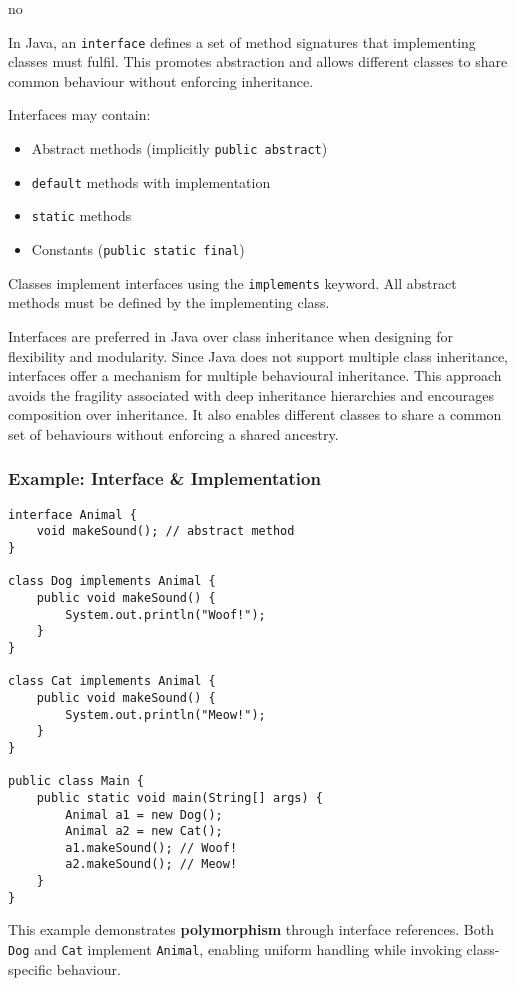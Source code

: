 no\documentclass{article}
\newcommand{\codecmd}[1]{\textcolor[rgb]{0,0.5,0}{\texttt{#1}}}
\begin{document}
In Java, an \codecmd{interface} defines a set of method signatures that implementing classes must fulfil. This promotes abstraction and allows different classes to share common behaviour without enforcing inheritance.

Interfaces may contain:
\begin{itemize}
    \item Abstract methods (implicitly \codecmd{public abstract})
    \item \codecmd{default} methods with implementation
    \item \codecmd{static} methods
    \item Constants (\codecmd{public static final})
\end{itemize}

Classes implement interfaces using the \codecmd{implements} keyword. All abstract methods must be defined by the implementing class.

Interfaces are preferred in Java over class inheritance when designing for flexibility and modularity. Since Java does not support multiple class inheritance, interfaces offer a mechanism for multiple behavioural inheritance. This approach avoids the fragility associated with deep inheritance hierarchies and encourages composition over inheritance. It also enables different classes to share a common set of behaviours without enforcing a shared ancestry.


\subsubsection*{Example: Interface \& Implementation}

\begin{verbatim}
interface Animal {
    void makeSound(); // abstract method
}

class Dog implements Animal {
    public void makeSound() {
        System.out.println("Woof!");
    }
}

class Cat implements Animal {
    public void makeSound() {
        System.out.println("Meow!");
    }
}

public class Main {
    public static void main(String[] args) {
        Animal a1 = new Dog();
        Animal a2 = new Cat();
        a1.makeSound(); // Woof!
        a2.makeSound(); // Meow!
    }
}
\end{verbatim}

This example demonstrates \textbf{polymorphism} through interface references. Both \codecmd{Dog} and \codecmd{Cat} implement \codecmd{Animal}, enabling uniform handling while invoking class-specific behaviour.
\end{document}
